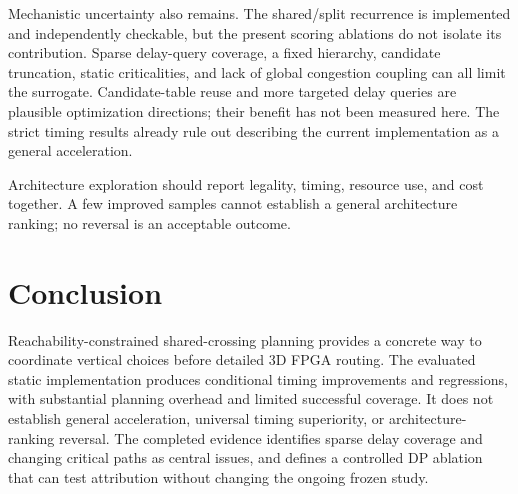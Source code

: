 \documentclass[conference,10pt]{IEEEtran}
\begin{document}
Mechanistic uncertainty also remains. The shared/split recurrence is implemented and independently checkable, but the present scoring ablations do not isolate its contribution. Sparse delay-query coverage, a fixed hierarchy, candidate truncation, static criticalities, and lack of global congestion coupling can all limit the surrogate. Candidate-table reuse and more targeted delay queries are plausible optimization directions; their benefit has not been measured here. The strict timing results already rule out describing the current implementation as a general acceleration.

Architecture exploration should report legality, timing, resource use, and cost together. A few improved samples cannot establish a general architecture ranking; no reversal is an acceptable outcome.

\section{Conclusion}
Reachability-constrained shared-crossing planning provides a concrete way to coordinate vertical choices before detailed 3D FPGA routing. The evaluated static implementation produces conditional timing improvements and regressions, with substantial planning overhead and limited successful coverage. It does not establish general acceleration, universal timing superiority, or architecture-ranking reversal. The completed evidence identifies sparse delay coverage and changing critical paths as central issues, and defines a controlled DP ablation that can test attribution without changing the ongoing frozen study.
\end{document}
